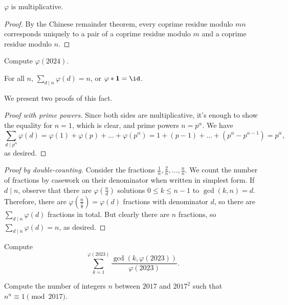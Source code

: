 \documentclass[11pt]{scrartcl}
\begin{document}
\begin{theorem}
    $\varphi$ is multiplicative.
\end{theorem}

\begin{proof}
	By the Chinese remainder theorem, every coprime residue modulo $mn$ corresponds uniquely to a pair of a coprime residue modulo $m$ and a coprime residue modulo $n$.
\end{proof}

\begin{problem}
	\label{pro:totient-2024}
    Compute $\varphi(2024)$.
\end{problem}

\begin{theorem}\label{thm:totient_sum}
	For all $n$, $\sum_{d \mid n}\varphi(d) = n$, or $\varphi \ast \mathbf 1 = \id$.
\end{theorem}

We present two proofs of this fact.
\begin{proof}[Proof with prime powers]
	Since both sides are multiplicative, it's enough to show the equality for $n = 1$, which is clear, and prime powers $n = p^\alpha$. We have
	\[\sum_{d \mid p^\alpha}\varphi(d) = \varphi(1) + \varphi(p) + \dots + \varphi(p^\alpha) = 1 + (p - 1) + \dots + \left(p^\alpha - p^{\alpha - 1}\right) = p^\alpha,\]
	as desired.
\end{proof}

\begin{proof}[Proof by double-counting]
	Consider the fractions $\frac1n,\frac2n,\dots,\frac nn$. We count the number of fractions by casework on their denominator when written in simplest form. If $d \mid n$, observe that there are $\varphi(\frac{n}{d})$ solutions $0 \le k \le n - 1$ to $\gcd(k,n) = d$. Therefore, there are $\varphi\left(\frac{n}{\frac nd}\right) = \varphi(d)$ fractions with denominator $d$, so there are $\sum_{d \mid n}\varphi(d)$ fractions in total. But clearly there are $n$ fractions, so $\sum_{d \mid n}\varphi(d) = n$, as desired.
\end{proof}

\begin{problem}[CMIMC 2023/A7]
	\label{pro:cmimc-2023}
	Compute
	\[\sum_{k = 1}^{\varphi(2023)}\frac{\gcd(k,\varphi(2023))}{\varphi(2023)}.\]
\end{problem}

\begin{problem}[PUMaC A 2016/N7]
	\label{pro:pumac-2016}
	Compute the number of integers $n$ between $2017$ and $2017^2$ such that $n^n \equiv 1 \pmod{2017}$.
\end{problem}
\end{document}
